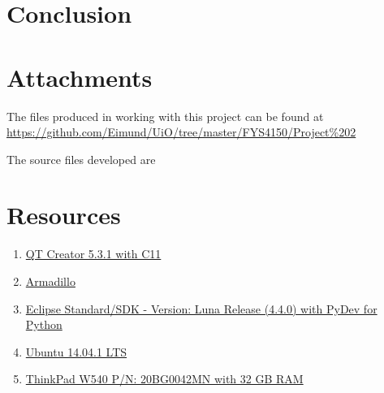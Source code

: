 \documentclass[11pt,english,a4paper]{article}
\begin{document}
\begin{flushleft}
\section{Conclusion}

\section{Attachments}

The files produced in working with this project can be found at \href{https://github.com/Eimund/UiO/tree/master/FYS4150/Project\%202}{https://github.com/Eimund/UiO/tree/master/FYS4150/Project\%202} \linebreak

The source files developed are

\section{Resources}

\begin{enumerate}
\item{\href{http://qt-project.org/downloads}{QT Creator 5.3.1 with C11}}
\item{\href{http://arma.sourceforge.net/}{Armadillo}}
\item{\href{https://www.eclipse.org/downloads/}{Eclipse Standard/SDK  - Version: Luna Release (4.4.0) with PyDev for Python}}
\item{\href{http://www.ubuntu.com/download/desktop}{Ubuntu 14.04.1 LTS}}
\item{\href{http://shop.lenovo.com/no/en/laptops/thinkpad/w-series/w540/#tab-reseller}{ThinkPad W540 P/N: 20BG0042MN with 32 GB RAM}}
\end{enumerate}


\end{flushleft}
\end{document}
